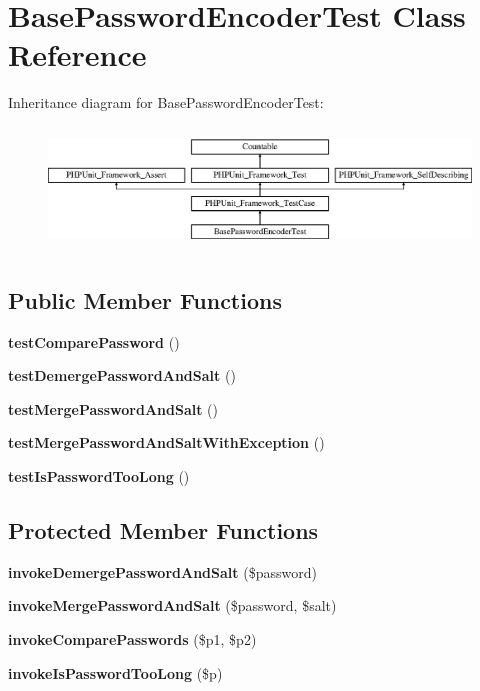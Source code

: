 \section{Base\+Password\+Encoder\+Test Class Reference}
\label{class_symfony_1_1_component_1_1_security_1_1_core_1_1_tests_1_1_encoder_1_1_base_password_encoder_test}
Inheritance diagram for Base\+Password\+Encoder\+Test\+:\begin{figure}[H]
\begin{center}
\leavevmode
\includegraphics[height=3.303835cm]{class_symfony_1_1_component_1_1_security_1_1_core_1_1_tests_1_1_encoder_1_1_base_password_encoder_test}
\end{center}
\end{figure}
\subsection*{Public Member Functions}
\begin{DoxyCompactItemize}
\item 
{\bf test\+Compare\+Password} ()
\item 
{\bf test\+Demerge\+Password\+And\+Salt} ()
\item 
{\bf test\+Merge\+Password\+And\+Salt} ()
\item 
{\bf test\+Merge\+Password\+And\+Salt\+With\+Exception} ()
\item 
{\bf test\+Is\+Password\+Too\+Long} ()
\end{DoxyCompactItemize}
\subsection*{Protected Member Functions}
\begin{DoxyCompactItemize}
\item 
{\bf invoke\+Demerge\+Password\+And\+Salt} (\$password)
\item 
{\bf invoke\+Merge\+Password\+And\+Salt} (\$password, \$salt)
\item 
{\bf invoke\+Compare\+Passwords} (\$p1, \$p2)
\item 
{\bf invoke\+Is\+Password\+Too\+Long} (\$p)
\end{DoxyCompactItemize}
